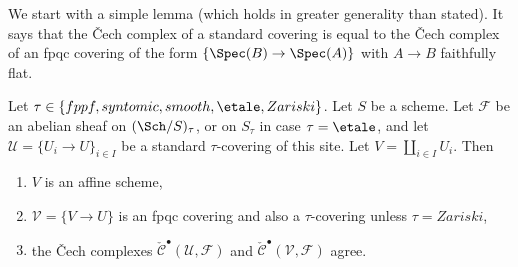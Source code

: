 \noindent
We start with a simple lemma (which holds in greater generality than
stated). It says that the {\v C}ech complex of a standard covering is
equal to the {\v C}ech complex of an fpqc covering of the form
$\{\Spec(B) \to \Spec(A)\}$ with $A \to B$ faithfully flat.

\begin{lemma}
\label{lemma-cech-complex}
Let $\tau \in \{fppf, syntomic, smooth, \etale, Zariski\}$.
Let $S$ be a scheme.
Let $\mathcal{F}$ be an abelian sheaf on $(\Sch/S)_\tau$, or on
$S_\tau$ in case $\tau = \etale$, and let
$\mathcal{U} = \{U_i \to U\}_{i \in I}$
be a standard $\tau$-covering of this site.
Let $V = \coprod_{i \in I} U_i$. Then
\begin{enumerate}
\item $V$ is an affine scheme,
\item $\mathcal{V} = \{V \to U\}$ is an fpqc covering
and also a $\tau$-covering unless $\tau = Zariski$,
\item the {\v C}ech complexes
$\check{\mathcal{C}}^\bullet (\mathcal{U}, \mathcal{F})$ and
$\check{\mathcal{C}}^\bullet (\mathcal{V}, \mathcal{F})$ agree.
\end{enumerate}
\end{lemma}

